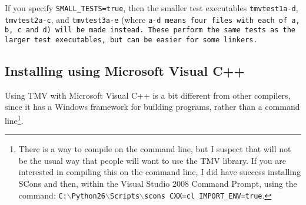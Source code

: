 \begin{enumerate}
If you specify \texttt{SMALL\_TESTS=true}, then the smaller test executables
\texttt{tmvtest1a-d}, \texttt{tmvtest2a-c}, and \texttt{tmvtest3a-e} (where \tt{a-d} means 
four files with each of \tt{a}, \tt{b}, \tt{c} and \tt{d})
will be made instead.
These perform the same tests as the larger test executables, but can be easier
for some linkers.

\end{enumerate}

\subsection{Installing using Microsoft Visual C++}
\label{Install_Microsoft}

Using TMV with Microsoft Visual C++ is a bit different from other compilers,
since it has a Windows framework for building programs, rather than a command 
line\footnote{
There is a way to compile on the command line, but I suspect that will not be the 
usual way that people will want to use the TMV library.  If you are interested in compiling
this on the command line, I did have success installing SCons and then, within the
Visual Studio 2008 Command Prompt, using the command:
\texttt{C:$\backslash$Python26$\backslash$Scripts$\backslash$scons CXX=cl IMPORT\_ENV=true}.}.

